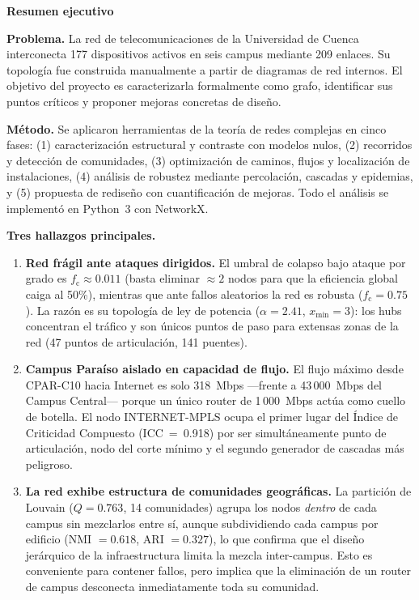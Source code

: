 \documentclass[11pt, a4paper]{article}
\newenvironment{resumen}{%
    \begin{mdframed}[backgroundcolor=grisfondo, linecolor=borde,
        linewidth=4pt, leftline=true, rightline=false,
        topline=false, bottomline=false,
        innerleftmargin=10pt, innerrightmargin=10pt,
        innertopmargin=8pt, innerbottommargin=8pt,
        leftmargin=0pt, rightmargin=0pt,
        skipabove=10pt, skipbelow=10pt]
    \small
}{\end{mdframed}}
\newcommand{\fc}{f_{\mathrm{c}}}
\begin{document}
\begin{center}
    {\large\bfseries\color{azulsec} Resumen ejecutivo}
\end{center}
\begin{resumen}
\textbf{Problema.} La red de telecomunicaciones de la Universidad de Cuenca
interconecta 177 dispositivos activos en seis campus mediante 209 enlaces. Su
topología fue construida manualmente a partir de diagramas de red internos.
El objetivo del proyecto es caracterizarla formalmente como grafo, identificar
sus puntos críticos y proponer mejoras concretas de diseño.

\medskip
\textbf{Método.} Se aplicaron herramientas de la teoría de redes complejas en
cinco fases: (1) caracterización estructural y contraste con modelos nulos,
(2) recorridos y detección de comunidades, (3) optimización de caminos, flujos
y localización de instalaciones, (4) análisis de robustez mediante percolación,
cascadas y epidemias, y (5) propuesta de rediseño con cuantificación de mejoras.
Todo el análisis se implementó en Python~3 con NetworkX.

\medskip
\textbf{Tres hallazgos principales.}
\begin{enumerate}
    \item \textbf{Red frágil ante ataques dirigidos.} El umbral de colapso bajo
    ataque por grado es $\fc \approx 0.011$ (basta eliminar $\approx 2$ nodos
    para que la eficiencia global caiga al 50\%), mientras que ante fallos
    aleatorios la red es robusta ($\fc = 0.75$). La razón es su topología de
    ley de potencia ($\alpha = 2.41$, $x_{\min}=3$): los hubs concentran el
    tráfico y son únicos puntos de paso para extensas zonas de la red (47
    puntos de articulación, 141 puentes).

    \item \textbf{Campus Paraíso aislado en capacidad de flujo.} El flujo
    máximo desde CPAR-C10 hacia Internet es solo 318~Mbps ---frente a
    43\,000~Mbps del Campus Central--- porque un único router de 1\,000~Mbps
    actúa como cuello de botella. El nodo INTERNET-MPLS ocupa el primer lugar
    del Índice de Criticidad Compuesto (ICC~=~0.918) por ser simultáneamente
    punto de articulación, nodo del corte mínimo y el segundo generador de
    cascadas más peligroso.

    \item \textbf{La red exhibe estructura de comunidades geográficas.} La
    partición de Louvain ($Q = 0.763$, 14 comunidades) agrupa los nodos
    \textit{dentro} de cada campus sin mezclarlos entre sí, aunque
    subdividiendo cada campus por edificio (NMI $=0.618$, ARI $=0.327$),
    lo que confirma que el diseño jerárquico de la infraestructura limita la
    mezcla inter-campus. Esto es conveniente para contener fallos, pero implica
    que la eliminación de un router de campus desconecta inmediatamente toda su
    comunidad.
\end{enumerate}


\end{resumen}
\end{document}
